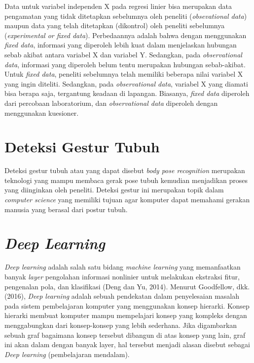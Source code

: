 Data untuk variabel independen X pada regresi linier bisa merupakan data pengamatan yang tidak ditetapkan sebelumnya oleh peneliti (\emph{obsevational data}) maupun data yang telah ditetapkan (dikontrol) oleh peneliti sebelumnya (\emph{experimental or fixed data}). Perbedaannya adalah bahwa dengan menggunakan \emph{fixed data}, informasi yang diperoleh lebih kuat dalam menjelaskan hubungan sebab akibat antara variabel X dan variabel Y. Sedangkan, pada \emph{observational data}, informasi yang diperoleh belum tentu merupakan hubungan sebab-akibat. Untuk \emph{fixed data}, peneliti sebelumnya telah memiliki beberapa nilai variabel X yang ingin diteliti. Sedangkan, pada \emph{observational data}, variabel X yang diamati bisa berapa saja, tergantung keadaan di lapangan. Biasanya, \emph{fixed data} diperoleh dari percobaan laboratorium, dan \emph{observational data} diperoleh dengan menggunakan kuesioner.


\section{Deteksi Gestur Tubuh}
\label{sec:deteksigesturtubuh}

Deteksi gestur tubuh atau yang dapat disebut \emph{body pose recognition} merupakan teknologi yang mampu membaca gerak pose tubuh kemudian menjadikan proses yang diinginkan oleh peneliti. Deteksi gestur ini merupakan topik dalam \emph{computer science} yang memiliki tujuan agar komputer dapat memahami gerakan manusia yang berasal dari postur tubuh.


\section{\emph{Deep Learning}}
\label{sec:deeplearning}

\emph{Deep learning} adalah salah satu bidang \emph{machine learning} yang memanfaatkan banyak \emph{layer} pengolahan informasi nonlinier untuk melakukan ekstraksi fitur, pengenalan pola, dan klasifikasi (Deng dan Yu, 2014). Menurut Goodfellow, dkk. (2016), \emph{Deep learning} adalah sebuah pendekatan dalam penyelesaian masalah pada sistem pembelajaran komputer yang menggunakan konsep hierarki. Konsep hierarki membuat komputer mampu mempelajari konsep yang kompleks dengan menggabungkan dari konsep-konsep yang lebih sederhana. Jika digambarkan sebuah graf bagaimana konsep tersebut dibangun di atas konsep yang lain, graf ini akan dalam dengan banyak layer, hal tersebut menjadi alasan disebut sebagai \emph{Deep learning} (pembelajaran mendalam).

